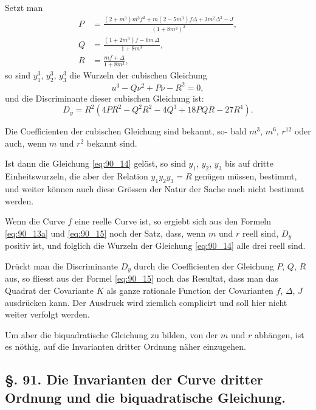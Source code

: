 \documentclass[12pt,a4paper]{article}
\theoremstyle{plain}
\theoremstyle{definition}
\theoremstyle{remark}
\begin{document}
Setzt man
\begin{align}
P &= \frac{(2 + m^3) m^3 f^2 + m(2 - 5m^3) f\Delta + 3m^2 \Delta^2 - J}{(1 + 8m^3)^2}, \label{eq:90_13a} \\
Q &= \frac{(1 + 2m^3) f - 6m\,\Delta}{1 + 8m^3}, \label{eq:90_13b} \\
R &= \frac{mf + \Delta}{1 + 8m^3}, \label{eq:90_13c}
\end{align}
so sind $y_1^3$, $y_2^3$, $y_3^3$ die Wurzeln der cubischen Gleichung
\begin{equation}\label{eq:90_14}
u^3 - Q\nu^2 + P\nu - R^2 = 0,
\end{equation}
und die Discriminante dieser cubischen Gleichung ist:
\begin{equation}\label{eq:90_15}
D_y = R^2(4PR^2 - Q^2 R^2 - 4Q^3 + 18PQR - 27R^4).
\end{equation}

Die Coefficienten der cubischen Gleichung sind bekannt, so-
bald $m^3$, $m^6$, $r^{12}$ oder auch, wenn $m$ und $r^2$ bekannt sind.

Ist dann die Gleichung \eqref{eq:90_14} gelöst, so sind $y_1$, $y_2$, $y_3$ bis auf
dritte Einheitswurzeln, die aber der Relation $y_1 y_2 y_3 = R$
genügen müssen, bestimmt, und weiter können auch diese Grössen
der Natur der Sache nach nicht bestimmt werden.

Wenn die Curve $f$ eine reelle Curve ist, so ergiebt sich aus
den Formeln \eqref{eq:90_13a} und \eqref{eq:90_15} noch der Satz, dass, wenn $m$ und $r$
reell sind, $D_y$ positiv ist, und folglich die Wurzeln der
Gleichung \eqref{eq:90_14} alle drei reell sind.

Drückt man die Discriminante $D_y$ durch die Coefficienten
der Gleichung $P$, $Q$, $R$ aus, so fliesst aus der Formel \eqref{eq:90_15} noch
das Resultat, dass man das Quadrat der Covariante $K$ als ganze
rationale Function der Covarianten $f$, $\Delta$, $J$ ausdrücken kann.
Der Ausdruck wird ziemlich complicirt und soll hier nicht weiter
verfolgt werden.

Um aber die biquadratische Gleichung zu bilden, von der
$m$ und $r$ abhängen, ist es nöthig, auf die Invarianten dritter
Ordnung näher einzugehen.

\subsection*{§. 91. Die Invarianten der Curve dritter Ordnung und die biquadratische Gleichung.}
\end{document}
